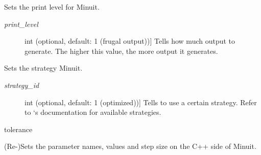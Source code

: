 \documentclass[a4paper,10pt,english]{sphinxmanual}
\begin{document}
\begin{fulllineitems}
\begin{fulllineitems}
\end{fulllineitems}


\begin{fulllineitems}
\label{index:kafe.minuit.Minuit.set_print_level}
Sets the print level for Minuit.
\begin{description}
\item[{\emph{print\_level}}] \leavevmode{[}int (optional, default: 1 (frugal output)){]}
Tells  how much output to generate. The higher this
value, the more output it generates.

\end{description}

\end{fulllineitems}


\begin{fulllineitems}
\label{index:kafe.minuit.Minuit.set_strategy}
Sets the strategy Minuit.
\begin{description}
\item[{\emph{strategy\_id}}] \leavevmode{[}int (optional, default: 1 (optimized)){]}
Tells  to use a certain strategy. Refer to `s
documentation for available strategies.

\end{description}

\end{fulllineitems}


\begin{fulllineitems}
\label{index:kafe.minuit.Minuit.tolerance}
 tolerance

\end{fulllineitems}


\begin{fulllineitems}
\label{index:kafe.minuit.Minuit.update_parameter_data}
(Re-)Sets the parameter names, values and step size on the
C++ side of Minuit.

\end{fulllineitems}


\end{fulllineitems}
\end{document}
